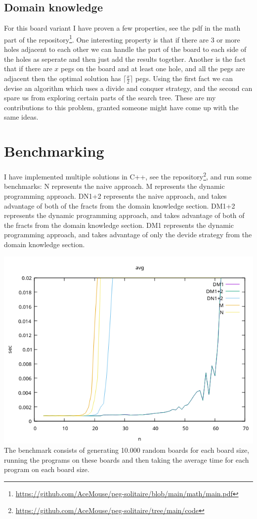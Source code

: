 \documentclass{article}
\begin{document}
\subsection{Domain knowledge}
For this board variant I have proven a few properties, see the pdf in the math part of the repository\footnote{\url{https://github.com/AceMouse/peg-solitaire/blob/main/math/main.pdf}}. One interesting property is that if there are 3 or more holes adjacent to each other we can handle the part of the board to each side of the holes as seperate and then just add the results together. Another is the fact that if there are $x$ pegs on the board and at least one hole, and all the pegs are adjacent then the optimal solution has $\lceil\frac{x}{2}\rceil$ pegs. Using the first fact we can devise an algorithm which uses a divide and conquer strategy, and the second can spare us from exploring certain parts of the search tree. These are my contributions to this problem, granted someone might have come up with the same ideas. 

\section{Benchmarking}
I have implemented multiple solutions in C++, see the repository\footnote{\url{https://github.com/AceMouse/peg-solitaire/tree/main/code}}, and run some benchmarks:
N represents the naive approach. 
M represents the dynamic programming approach. 
DN1+2 represents the naive approach, and takes advantage of both of the fracts from the domain knowledge section. 
DM1+2 represents the dynamic programming approach, and takes advantage of both of the fracts from the domain knowledge section. 
DM1 represents the dynamic programming approach, and takes advantage of only the devide strategy from the domain knowledge section. 

\includegraphics[width=\textwidth]{./cpp_comparison}
The benchmark consists of generating 10.000 random boards for each board size, running the programs on these boards and then taking the average time for each program on each board size.
\end{document}
